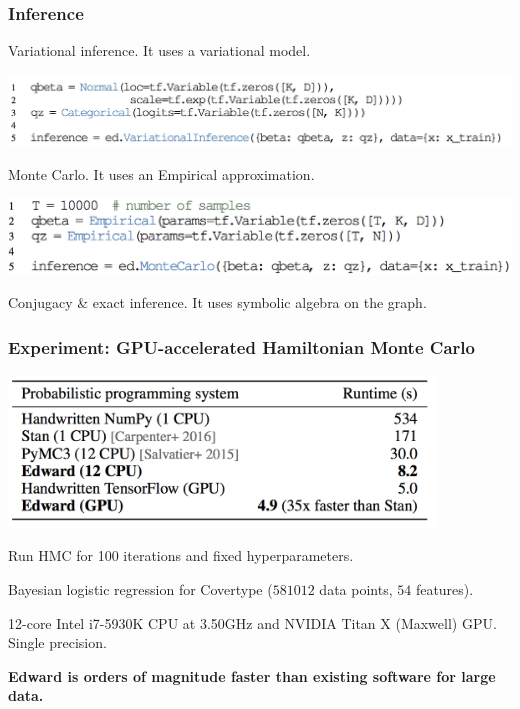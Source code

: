 \documentclass[10pt,
               xcolor={usenames,dvipsnames},
               hyperref={colorlinks,linktoc=all,citecolor=Plum,linkcolor=MidnightBlue,urlcolor=MidnightBlue},noamssymb]{beamer}
\begin{document}
\begin{frame}
\frametitle{Inference}
Variational inference. It uses a variational model.
\begin{center}
\vspace{-2.0ex}
\includegraphics[height=0.18\textheight]{img/inference_variational.png}
\end{center}
Monte Carlo. It uses an Empirical approximation.
\begin{center}
\includegraphics[height=0.17\textheight]{img/inference_monte.png}
\end{center}

Conjugacy \& exact inference. It uses symbolic algebra on the graph.
\end{frame}

\begin{frame}
\frametitle{Experiment: GPU-accelerated Hamiltonian Monte Carlo}
\begin{center}
\includegraphics[width=0.85\textwidth]{img/experiments_hmc.png}
\end{center}
\vspace{-1ex}
Run HMC for 100 iterations and fixed hyperparameters.

Bayesian logistic regression for Covertype ($581012$ data points, $54$
features).

12-core Intel i7-5930K CPU at 3.50GHz and NVIDIA Titan X (Maxwell) GPU.
Single precision.

\vspace{4ex}
\textbf{Edward is orders of magnitude faster than existing software
for large data.}
\end{frame}
\end{document}
